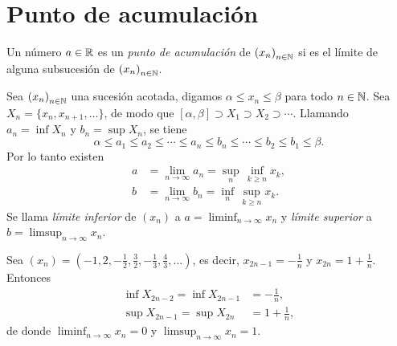 \section{Punto de acumulación}

\begin{definition}
  Un número \(a \in \mathbb{R}\) es un \emph{punto de acumulación} de \({(x_n)}_{n \in \mathbb{N}}\) si es el límite de alguna subsucesión de \({(x_n)}_{n \in \mathbb{N}}\).
\end{definition}

\begin{definition}
  Sea \({(x_n)}_{n \in \mathbb{N}}\) una sucesión acotada, digamos \(\alpha \leq x_n \leq \beta\) para todo \(n \in \mathbb{N}\). Sea \(X_n = \{ x_n, x_{n+1}, \dots \}\), de modo que \([\alpha, \beta] \supset X_1 \supset X_2 \supset \cdots\). Llamando \(a_n = \inf X_n\) y \(b_n = \sup X_n\), se tiene
  \[
    \alpha \leq a_1 \leq a_2 \leq \cdots \leq a_n \leq b_n \leq \cdots \leq b_2 \leq b_1 \leq \beta.
  \]
  Por lo tanto existen
  \begin{align*}
    a & = \lim_{n \to \infty} a_n = \sup_{n} \, \inf_{k \geq n} x_k, \\
    b & = \lim_{n \to \infty} b_n = \inf_{n} \, \sup_{k \geq n} x_k.
  \end{align*}
  Se llama \emph{límite inferior} de \({(x_n)}\) a \(a = \liminf_{n \to \infty} x_n\) y \emph{límite superior} a \(b = \limsup_{n \to \infty} x_n\).
\end{definition}

\begin{eg}
  Sea \({(x_n)} = (-1, 2, -\frac{1}{2}, \frac{3}{2}, -\frac{1}{3}, \frac{4}{3}, \dots)\), es decir, \(x_{2n-1} = -\frac{1}{n}\) y \(x_{2n} = 1 + \frac{1}{n}\). Entonces
  \begin{align*}
    \inf X_{2n-2} = \inf X_{2n-1} & = -\frac{1}{n},    \\
    \sup X_{2n-1} = \sup X_{2n}   & = 1 + \frac{1}{n},
  \end{align*}
  de donde \(\liminf_{n \to \infty} x_n = 0\) y \(\limsup_{n \to \infty} x_n = 1\).
\end{eg}
